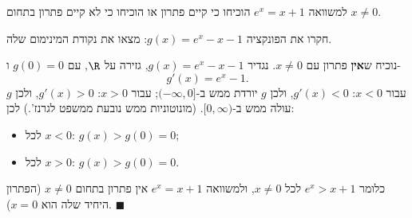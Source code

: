 
\begin{question}
למשוואה $e^x=x+1$ הוכיחו כי קיים פתרון או הוכיחו כי לא קיים פתרון בתחום $x\neq0$.
\end{question}

\begin{hint}
חקרו את הפונקציה $g(x)=e^x-x-1$: מצאו את נקודת המינימום שלה.
\end{hint}

\begin{solution}
נוכיח ש\textbf{אין} פתרון עם $x\neq 0$. נגדיר $g(x)=e^x-x-1$, גזירה על $\R$, עם $g(0)=0$ ו-
\[ g'(x)=e^x-1. \]
עבור $x<0$: $g'(x)<0$, ולכן $g$ יורדת ממש ב-$(-\infty,0]$; עבור $x>0$: $g'(x)>0$, ולכן $g$ עולה ממש ב-$[0,\infty)$. (מונוטוניות ממש נובעת ממשפט לגרנז'.) לכן:
\begin{itemize}
  \item לכל $x<0$: $g(x)>g(0)=0$;
  \item לכל $x>0$: $g(x)>g(0)=0$.
\end{itemize}
כלומר $e^x>x+1$ לכל $x\neq0$, ולמשוואה $e^x=x+1$ אין פתרון בתחום $x\ne 0$ (הפתרון היחיד שלה הוא $x=0$). $\blacksquare$
\end{solution}
